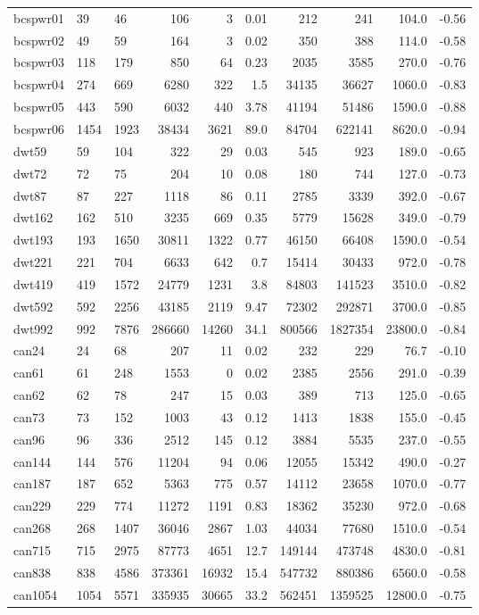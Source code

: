 \documentclass{scrartcl}
\theoremstyle{plain}
\begin{document}
\begin{table}[!ht]
\begin{tabular}{|lll|rrr|rrr|r|}
\makeatletter{}bcspwr01 & 39 & 46 & 106 & 3 & 0.01 & 212 & 241 & 104.0 & -0.56 \\ 
 bcspwr02 & 49 & 59 & 164 & 3 & 0.02 & 350 & 388 & 114.0 & -0.58 \\ 
 bcspwr03 & 118 & 179 & 850 & 64 & 0.23 & 2035 & 3585 & 270.0 & -0.76 \\ 
 bcspwr04 & 274 & 669 & 6280 & 322 & 1.5 & 34135 & 36627 & 1060.0 & -0.83 \\ 
 bcspwr05 & 443 & 590 & 6032 & 440 & 3.78 & 41194 & 51486 & 1590.0 & -0.88 \\ 
 bcspwr06 & 1454 & 1923 & 38434 & 3621 & 89.0 & 84704 & 622141 & 8620.0 & -0.94 \\ 
 dwt59 & 59 & 104 & 322 & 29 & 0.03 & 545 & 923 & 189.0 & -0.65 \\ 
 dwt72 & 72 & 75 & 204 & 10 & 0.08 & 180 & 744 & 127.0 & -0.73 \\ 
 dwt87 & 87 & 227 & 1118 & 86 & 0.11 & 2785 & 3339 & 392.0 & -0.67 \\ 
 dwt162 & 162 & 510 & 3235 & 669 & 0.35 & 5779 & 15628 & 349.0 & -0.79 \\ 
 dwt193 & 193 & 1650 & 30811 & 1322 & 0.77 & 46150 & 66408 & 1590.0 & -0.54 \\ 
 dwt221 & 221 & 704 & 6633 & 642 & 0.7 & 15414 & 30433 & 972.0 & -0.78 \\ 
 dwt419 & 419 & 1572 & 24779 & 1231 & 3.8 & 84803 & 141523 & 3510.0 & -0.82 \\ 
 dwt592 & 592 & 2256 & 43185 & 2119 & 9.47 & 72302 & 292871 & 3700.0 & -0.85 \\ 
 dwt992 & 992 & 7876 & 286660 & 14260 & 34.1 & 800566 & 1827354 & 23800.0 & -0.84 \\ 
 can24 & 24 & 68 & 207 & 11 & 0.02 & 232 & 229 & 76.7 & -0.10 \\ 
 can61 & 61 & 248 & 1553 & 0 & 0.02 & 2385 & 2556 & 291.0 & -0.39 \\ 
 can62 & 62 & 78 & 247 & 15 & 0.03 & 389 & 713 & 125.0 & -0.65 \\ 
 can73 & 73 & 152 & 1003 & 43 & 0.12 & 1413 & 1838 & 155.0 & -0.45 \\ 
 can96 & 96 & 336 & 2512 & 145 & 0.12 & 3884 & 5535 & 237.0 & -0.55 \\ 
 can144 & 144 & 576 & 11204 & 94 & 0.06 & 12055 & 15342 & 490.0 & -0.27 \\ 
 can187 & 187 & 652 & 5363 & 775 & 0.57 & 14112 & 23658 & 1070.0 & -0.77 \\ 
 can229 & 229 & 774 & 11272 & 1191 & 0.83 & 18362 & 35230 & 972.0 & -0.68 \\ 
 can268 & 268 & 1407 & 36046 & 2867 & 1.03 & 44034 & 77680 & 1510.0 & -0.54 \\ 
 can715 & 715 & 2975 & 87773 & 4651 & 12.7 & 149144 & 473748 & 4830.0 & -0.81 \\ 
 can838 & 838 & 4586 & 373361 & 16932 & 15.4 & 547732 & 880386 & 6560.0 & -0.58 \\ 
 can1054 & 1054 & 5571 & 335935 & 30665 & 33.2 & 562451 & 1359525 & 12800.0 & -0.75 \\ 
  

\end{tabular}
\end{table}
\end{document}

